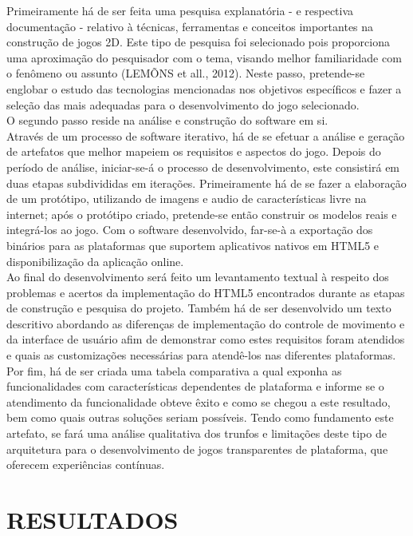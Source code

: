 \documentclass{article}
\begin{document}
Primeiramente há de ser feita uma pesquisa explanatória - e respectiva documentação - relativo à técnicas, ferramentas e conceitos importantes na construção de jogos 2D. Este tipo de pesquisa foi selecionado pois proporciona uma aproximação do pesquisador com o tema, visando melhor familiaridade com o fenômeno ou assunto (LEMÕNS et all., 2012). Neste passo, pretende-se englobar o estudo das tecnologias mencionadas nos objetivos específicos e fazer a seleção das mais adequadas para o desenvolvimento do jogo selecionado.  
\\
O segundo passo reside na análise e construção do software em si.
\\
Através de um processo de software iterativo, há de se efetuar a análise e geração de artefatos que melhor mapeiem os requisitos e aspectos do jogo. Depois do período de análise, iniciar-se-á o processo de desenvolvimento, este consistirá em duas etapas subdivididas em iterações. Primeiramente há de se fazer a elaboração de um protótipo, utilizando de imagens e audio de características livre na internet; após o protótipo criado, pretende-se então construir os modelos reais e integrá-los ao jogo. Com o software desenvolvido, far-se-à a exportação dos binários para as plataformas que suportem aplicativos nativos em HTML5 e disponibilização da aplicação online.
\\
Ao final do desenvolvimento será feito um levantamento textual à respeito dos problemas e acertos da implementação do HTML5 encontrados durante as etapas de construção e pesquisa do projeto. Também há de ser desenvolvido um texto descritivo abordando as diferenças de implementação do controle de movimento e da interface de usuário afim de demonstrar como estes requisitos foram atendidos e quais as customizações necessárias para atendê-los nas diferentes plataformas.
\\
Por fim, há de ser criada  uma tabela comparativa a qual exponha as funcionalidades com características dependentes de plataforma e informe se o atendimento da funcionalidade obteve êxito e como se chegou a este resultado, bem como quais outras soluções seriam possíveis. Tendo como fundamento este artefato, se fará uma análise qualitativa dos trunfos e limitações deste tipo de arquitetura para o desenvolvimento de jogos transparentes de plataforma, que oferecem experiências contínuas.

\section{RESULTADOS}
\end{document}
